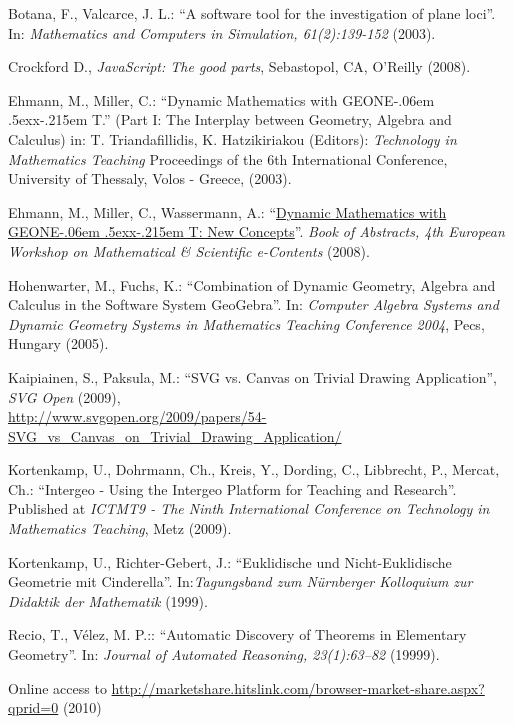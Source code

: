 \documentclass[12pt,a4paper]{article}%
\def\GEONExT{GEONE\kern-.06em \lower.5ex\hbox{x}\kern-.215em T}
\begin{document}
\begin{thebibliography}{99}
     Botana, F., Valcarce, J. L.:
        ``A software tool for the investigation of plane loci''.
        In: \emph{Mathematics and Computers in Simulation, 61(2):139-152} (2003).

     Crockford D., \emph{JavaScript: The good parts}, Sebastopol, CA, O'Reilly (2008).
    
     Ehmann, M., Miller, C.: ``Dynamic Mathematics with \GEONExT.''
        (Part I: The Interplay between Geometry, Algebra and Calculus)
        in: T. Triandafillidis, K. Hatzikiriakou (Editors): \emph{Technology in Mathematics Teaching}
        Proceedings of the 6th International Conference, University of Thessaly, Volos - Greece, (2003).
 
     Ehmann, M., Miller, C., Wassermann, A.: 
        ``\href{http://jsxgraph.uni-bayreuth.de/talks/jsxgraphMathematical_and_Scientific_e-Contents.pdf}{Dynamic Mathematics with \GEONExT{}: New Concepts}''. 
        \emph{Book of Abstracts, 4th European Workshop on Mathematical \& Scientific e-Contents}
        (2008).   

     Hohenwarter, M., Fuchs, K.: 
        ``Combination of Dynamic Geometry, Algebra and Calculus in the Software System GeoGebra''.  
        In: \emph{Computer Algebra Systems and Dynamic Geometry Systems in Mathematics Teaching Conference 2004}, 
        Pecs, Hungary (2005).

     Kaipiainen, S., Paksula, M.: 
           ``SVG vs. Canvas on Trivial Drawing Application'', \emph{SVG Open} (2009), \\
              \href{http://www.svgopen.org/2009/papers/54-SVG_vs_Canvas_on_Trivial_Drawing_Application/}{http://www.svgopen.org/2009/papers/54-SVG\_vs\_Canvas\_on\_Trivial\_Drawing\_Application/}

     Kortenkamp, U., Dohrmann, Ch., Kreis, Y., Dording, C., Libbrecht, P., Mercat, Ch.:
        ``Intergeo - Using the Intergeo Platform for Teaching and Research''. 
            Published at \emph{ICTMT9 - The Ninth International Conference on Technology in Mathematics Teaching},
            Metz (2009).

     Kortenkamp, U., Richter-Gebert, J.: 
        ``Euklidische und Nicht-Euklidische Geometrie mit Cinderella''. 
        In:\emph{Tagungsband zum N\"{u}rnberger Kolloquium zur Didaktik der Mathematik} (1999).
    
    
     Recio, T., V\'elez, M. P.::
        ``Automatic Discovery of Theorems in Elementary Geometry''.
        In: \emph{Journal of Automated Reasoning, 23(1):63–82} (19999).

     Online access to \href{http://marketshare.hitslink.com/browser-market-share.aspx?qprid=0}{http://marketshare.hitslink.com/browser-market-share.aspx?qprid=0} (2010)

\end{thebibliography}
\end{document}

